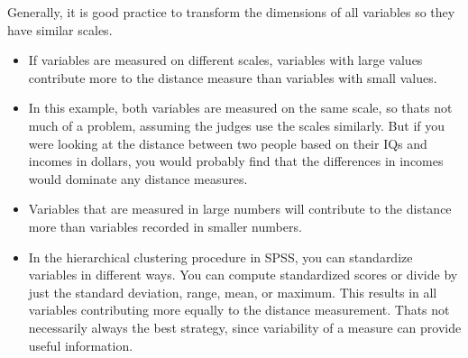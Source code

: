 \documentclass[a4paper,12pt]{report}
\begin{document}
\begin{framed}
	Generally, it is good practice to transform the dimensions of all variables so they have similar scales.
\end{framed}
\begin{itemize}
	\item If variables are measured on different scales, variables with large values contribute
	more to the distance measure than variables with small values. 
	\item In this example, both
	variables are measured on the same scale, so thats not much of a problem, assuming
	the judges use the scales similarly. But if you were looking at the distance between two
	people based on their IQs and incomes in dollars, you would probably find that the
	differences in incomes would dominate any distance measures.
	
	
	\item Variables that are measured in large numbers will contribute to the distance more than variables recorded in smaller
	numbers.
	
	\item In the hierarchical clustering procedure in SPSS, you can standardize variables in
	different ways. You can compute standardized scores or divide by just the standard
	deviation, range, mean, or maximum. This results in all variables contributing more
	equally to the distance measurement. Thats not necessarily always the best strategy,
	since variability of a measure can provide useful information. 
	
\end{itemize}
\newpage
\end{document}
